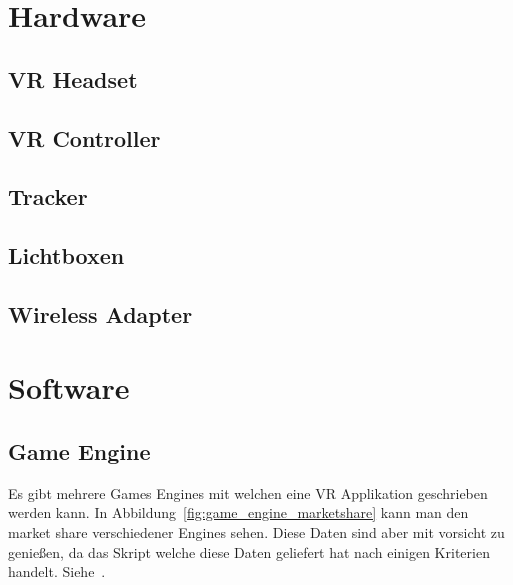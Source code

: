 \section{Hardware}
\lipsum[5-12]

\subsection{VR Headset}
\lipsum[5-12]

\subsection{VR Controller}
\lipsum[5-12]

\subsection{Tracker}
\lipsum[5-12]

\subsection{Lichtboxen}\label{sec:lighthouse}
\lipsum[5-12]

\subsection{Wireless Adapter }
\lipsum[5-12]

\section{Software}

\subsection{Game Engine}

Es gibt mehrere Games Engines mit welchen eine VR Applikation geschrieben werden kann.
In Abbildung~\ref{fig:game_engine_marketshare} kann man den market share verschiedener Engines sehen.
Diese Daten sind aber mit vorsicht zu genießen, da das Skript welche diese Daten geliefert hat nach einigen Kriterien handelt.
Siehe~\cite{REDDIT_2018}.

